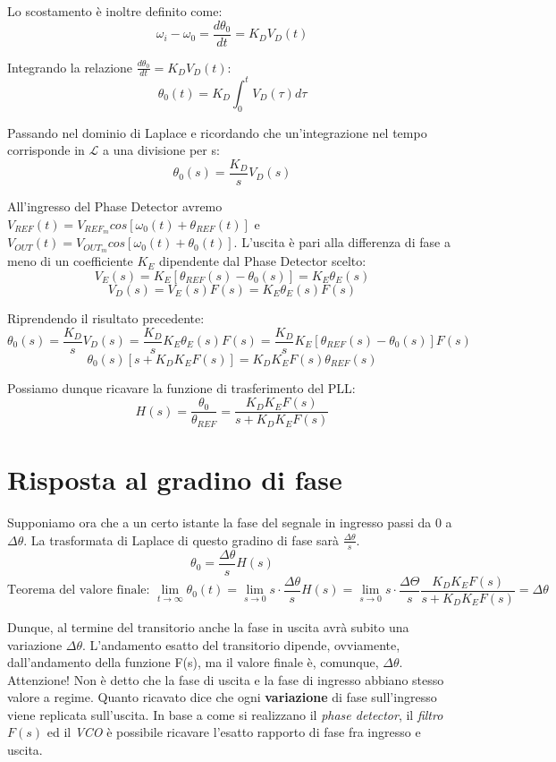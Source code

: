 Lo scostamento è inoltre definito come:
\[\omega_i - \omega_0 = \frac{d \theta_0}{dt} = K_D V_D (t)\]

Integrando la relazione $\frac{d\theta_0}{dt} = K_D V_D(t)$:
\[\theta_0(t) = K_D \int_{0}^{t} V_D (\tau) d \tau\]

Passando nel dominio di Laplace e ricordando che un'integrazione nel tempo corrisponde in $\mathscr{L}$ a una divisione per s:
\[\theta_0(s) = \frac{K_D}{s} V_D(s)\]

All'ingresso del Phase Detector avremo $V_{REF} (t) = V_{{REF}_m} cos\left[ \omega_0 (t) + \theta_{REF}(t)\right]$ e $V_{OUT}(t)= V_{{OUT}_m} cos\left[ \omega_0 (t) + \theta_0 (t) \right]$. L'uscita è pari alla differenza di fase a meno di un coefficiente $K_E$ dipendente dal Phase Detector scelto:
\[V_E(s) = K_E\left[ \theta_{REF} (s) - \theta_0 (s)\right] = K_E \theta_E (s) \] 
\[V_D (s) = V_E (s) F(s) = K_E \theta_E (s) F(s)\]

Riprendendo il risultato precedente:
\[\theta_0(s) = \frac{K_D}{s} V_D(s) = \frac{K_D}{s} K_E \theta_E (s) F(s) = \frac{K_D}{s} K_E\left[ \theta_{REF} (s) - \theta_0 (s)\right] F(s)\]
\[\theta_0(s) \left[ s + K_D K_E F(s) \right] = K_D K_E F(s) \theta_{REF} (s)\]

Possiamo dunque ricavare la funzione di trasferimento del PLL:
\[H(s) = \frac{\theta_0}{\theta_{REF}} = \frac{K_D K_E F(s)}{s + K_D K_E F(s)}\]

\section{Risposta al gradino di fase}
Supponiamo ora che a un certo istante la fase del segnale in ingresso passi da $0$ a $\Delta\theta$. La trasformata di Laplace di questo gradino di fase sarà $\frac{\Delta\theta}{s}$.
\[\theta_0 = \frac{\Delta\theta}{s} H(s) \]
$$\mbox{Teorema del valore finale: } \lim\limits_{t \rightarrow \infty} \theta_0 (t) = 
\lim\limits_{s \rightarrow 0} s \cdot \frac{\Delta\theta}{s} H(s) = 
\lim\limits_{s \rightarrow 0} s \cdot \frac{\Delta \Theta}{s} \frac{K_D K_E F(s)}{s + K_D K_E F(s)} =
\Delta \theta
$$

Dunque, al termine del transitorio anche la fase in uscita avrà subito una variazione $\Delta\theta$.
L'andamento esatto del transitorio dipende, ovviamente, dall'andamento della funzione F(s), ma il
valore finale è, comunque, $\Delta \theta$.\\
Attenzione! Non è detto che la fase di uscita e la fase di ingresso abbiano stesso valore a regime. Quanto ricavato dice che ogni \textbf{variazione} di fase sull'ingresso viene replicata sull'uscita. In base a come si realizzano il \textit{phase detector}, il \textit{filtro} $F(s)$ ed il \textit{VCO} è possibile ricavare l'esatto rapporto di fase fra ingresso e uscita.

